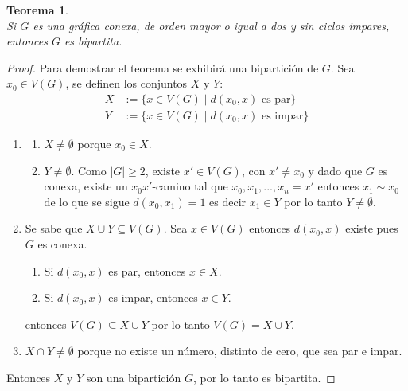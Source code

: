 \documentclass[12pt]{book}
\newtheorem{theorem}{Teorema}
\theoremstyle{definition}
\begin{document}
\begin{theorem}\textbf{}\\
  Si $G$ es una gráfica conexa, de orden mayor o igual a dos y sin ciclos
  impares, entonces $G$ es bipartita.
\end{theorem}

\begin{proof} Para demostrar el teorema se exhibirá una bipartición de $G$. Sea $x_0\in V(G)$, se definen los conjuntos $X$ y $Y$:
\begin{equation*}
  \begin{split}
    X&:=\{ x\in V(G)\mid \text{$d(x_0,x)$ es par}\}\\
    Y&:=\{ x\in V(G)\mid \text{$d(x_0,x)$ es impar}\}
  \end{split}
\end{equation*}

\begin{enumerate}

\item
  \begin{enumerate}
  \item $X\neq \emptyset$ porque $x_0 \in X$.
  \item $Y\neq \emptyset$. Como $|G| \geq 2$, existe $x' \in V(G)$,
    con $x' \neq x_0$ y dado que $G$ es conexa, existe un
    $x_0x'$-camino tal que $x_0, x_1,..., x_n=x'$ entonces $ x_1\sim
    x_0$ de lo que se sigue $d(x_0,x_1)=1$ es decir $x_1 \in Y$ por lo
    tanto $ Y\neq \emptyset$.
  \end{enumerate}
\item Se sabe que $X \cup Y \subseteq V(G)$. Sea $x\in V(G)$ entonces
  $d(x_0,x)$ existe pues $G$ es conexa.

  \begin{enumerate}
  \item Si $d(x_0,x)$ es par, entonces $x\in X$.
  \item Si $d(x_0,x)$ es impar, entonces $x\in Y$.
  \end{enumerate}

  entonces $V(G)\subseteq X\cup Y$ por lo tanto $V(G)= X\cup Y$.

\item $X\cap Y \neq \emptyset$ porque no existe un número, distinto de
  cero, que sea par e impar.
\end{enumerate}

Entonces $X$ y $Y$ son una bipartición $G$, por lo tanto es bipartita.
\end{proof}
\end{document}
